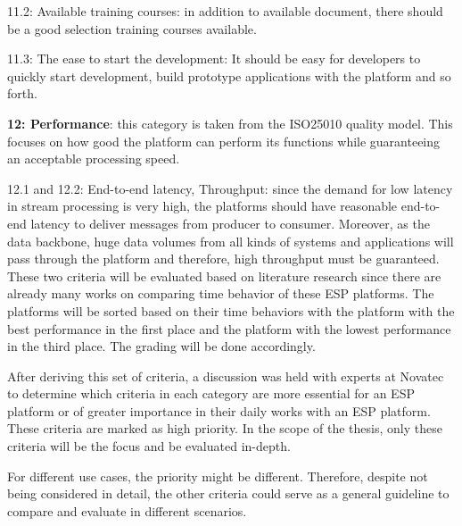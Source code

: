 11.2: Available training courses: in addition to available document, there should be a good selection training courses available. 

11.3: The ease to start the development: It should be easy for developers to quickly start development, build prototype applications with the platform and so forth.

\textbf{12: Performance}: this category is taken from the ISO25010 quality model. This focuses on how good the platform can perform its functions while guaranteeing an acceptable processing speed. 

12.1 and 12.2: End-to-end latency, Throughput: since the demand for low latency in stream processing is very high, the platforms should have reasonable end-to-end latency to deliver messages from producer to consumer. Moreover, as the data backbone, huge data volumes from all kinds of systems and applications will pass through the platform and therefore, high throughput must be guaranteed. These two criteria will be evaluated based on literature research since there are already many works on comparing time behavior of these ESP platforms. The platforms will be sorted based on their time behaviors with the platform with the best performance in the first place and the platform with the lowest performance in the third place. The grading will be done accordingly.

After deriving this set of criteria, a discussion was held with experts at Novatec to determine which criteria in each category are more essential for an ESP platform or of greater importance in their daily works with an ESP platform. These criteria are marked as high priority. In the scope of the thesis, only these criteria will be the focus and be evaluated in-depth. 

For different use cases, the priority might be different. Therefore, despite not being considered in detail, the other criteria could serve as a general guideline to compare and evaluate in different scenarios. 

